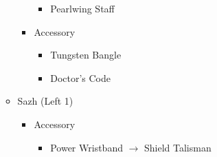\documentclass{report}
\begin{document}
\begin{menu}
\begin{itemize}
\begin{itemize}
\begin{itemize}
\begin{itemize}
                \item Pearlwing Staff
            \end{itemize}
            \item Accessory
            \begin{itemize}
                \item Tungsten Bangle
                \item Doctor's Code
            \end{itemize}
        \end{itemize}
        \item Sazh (Left 1)
        \begin{itemize}
            \item Accessory
            \begin{itemize}
                \item Power Wristband $\rightarrow$ Shield Talisman
            \end{itemize}
        \end{itemize}
    \end{itemize}
\end{itemize}
\end{menu}

\renewcommand{\first}{[1] }
\renewcommand{\second}{[2] Tireless Charge (\com/\med/\com)}
\renewcommand{\third}{[3] Hero's Charge (\syn/\med/\com)}
\renewcommand{\fourth}{[4] }
\renewcommand{\fifth}{[5] }
\renewcommand{\sixth}{[6] }
\end{document}
